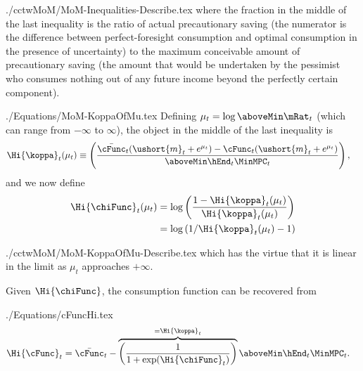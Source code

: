 \documentclass[titlepage]{\econtex}
\begin{document}

\begin{verbatimwrite}{./cctwMoM/MoM-Inequalities-Describe.tex}
  where the fraction in the middle of the last inequality is the ratio
  of actual precautionary saving (the numerator is the difference
  between perfect-foresight consumption and optimal consumption in the
  presence of uncertainty) to the maximum conceivable amount of
  precautionary saving (the amount that would be undertaken by the
  pessimist who consumes nothing out of any future income beyond the perfectly certain component).
\end{verbatimwrite}


\begin{verbatimwrite}{./Equations/MoM-KoppaOfMu.tex}
  Defining $\mu_{t} =
  \log \aboveMin \mRat_{t}$ (which can range from $-\infty$ to $\infty$), the object in the middle of the last inequality is
  \begin{equation}\begin{gathered}\begin{aligned}
    \Hi{\koppa}_{t}(\mu_{t})   & \equiv  \left(\frac{\bar{\cFunc}_{t}(\ushort{m}_{t}+e^{\mu_{t}})-\cFunc_{t}(\ushort{m}_{t}+e^{\mu_{t}})}{\aboveMin \hEnd_{t} \MinMPC_{t}}\right), \label{eq:koppa}
  \end{aligned}\end{gathered}\end{equation}
  and we now define
  \begin{equation}\begin{gathered}\begin{aligned}
    \Hi{\chiFunc}_{t}(\mu_{t})  & = \log \left(\frac{1-\Hi{\koppa}_{t}(\mu_{t})}{\Hi{\koppa}_{t}(\mu_{t})}\right)
    \\  & = \log \left(1/\Hi{\koppa}_{t}(\mu_{t})-1\right) \label{eq:chi}
  \end{aligned}\end{gathered}\end{equation}
\end{verbatimwrite}

\begin{verbatimwrite}{./cctwMoM/MoM-KoppaOfMu-Describe.tex}
  which has the virtue that it is linear in the limit as $\mu_{t}$ approaches $+\infty$.

  Given $\Hi{\chiFunc}$, the consumption function can be recovered from
\end{verbatimwrite}

\begin{verbatimwrite}{./Equations/cFuncHi.tex}
  \begin{equation}\begin{gathered}\begin{aligned}
    \Hi{\cFunc}_{t}  & = \bar{\cFunc}_{t}-\overbrace{\left(\frac{1}{1+\exp(\Hi{\chiFunc}_{t})}\right)}^{=\Hi{\koppa}_{t}} \aboveMin \hEnd_{t} \MinMPC_{t}. \label{eq:cFuncHi}
  \end{aligned}\end{gathered}\end{equation}
\end{verbatimwrite}

\end{document}
